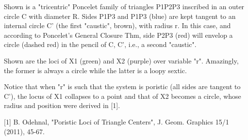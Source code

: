 Shown is a "tricentric" Poncelet family of triangles P1P2P3 inscribed in an outer circle C with diameter R. Sides P1P3 and P1P3 (blue) are kept tangent to an internal circle C' (the first "caustic", brown), with radius r. In this case, and according to Poncelet's General Closure Thm, side P2P3 (red) will envelop a circle (dashed red) in the pencil of C, C', i.e., a second "caustic".

Shown are the loci of X1 (green) and X2 (purple) over variable "r". Amazingly, the former is always a circle while the latter is a loopy sextic. 

Notice that when "r" is such that the system is poristic (all sides are tangent to C'), the locus of X1 collapses to a point and that of X2 becomes a circle, whose radius and position were derived in [1].

[1] B. Odehnal, "Poristic Loci of Triangle Centers", J. Geom. Graphics 15/1 (2011), 45-67.